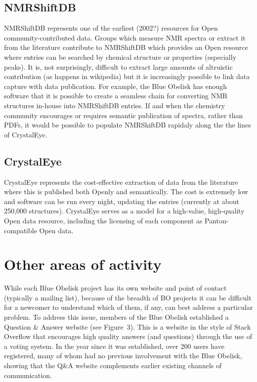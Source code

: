 \documentclass[10pt]{bmc_article}
\newenvironment{bmcformat}{\fussy\setboolean{publ}{true}}{\fussy}
\begin{document}
\begin{bmcformat}
\subsection*{NMRShiftDB}

NMRShiftDB represents one of the earliest (2002?) resources for Open
community-contributed data. Groups which
measure NMR spectra or extract it from the literature contribute to
NMRShiftDB which provides an Open resource where
entries can be searched by chemical structure or properties
(especially peaks). It is, not surprisingly, difficult to
extract large amounts of altruistic contribution (as happens in
wikipedia) but it is increasingly possible to link
data capture with data publication. For example, the Blue Obelisk has
enough software that it is possible to create
a seamless chain for converting NMR structures in-house into
NMRShiftDB entries. If and when the chemistry community
encourages or requires semantic publication of spectra, rather than
PDFs, it would be possible to populate NMRShiftDB rapidaly
along the the lines of CrystalEye.

\subsection*{CrystalEye}

CrystalEye represents the cost-effective extraction of data from the
literature where this is published both
Openly and semantically. The cost is extremely low and software can be
run every night, updating the entries
(currently at about 250,000 structures). CrystalEye serves as a model
for a high-value, high-quality Open data
resource, including the licensing of each component as
Panton-compatible Open data.

\section*{Other areas of activity}

While each Blue Obelisk project has its own website and point of
contact (typically a mailing list), because of the breadth of BO
projects it can be difficult for a newcomer to understand which of
them, if any, can best address a particular problem. To address this
issue, members of the Blue Obelisk established a Question \& Answer
website\cite{WebBOShapado} (see Figure~3).  This is a website in the
style of Stack Overflow\cite{WebStackOverflow} that encourages high quality answers (and
questions) through the use of a voting system. In the year since it
was established, over 200 users have registered, many of whom had no
previous involvement with the Blue Obelisk, showing that the Q\&A
website complements earlier existing channels of communication.


\end{bmcformat}
\end{document}
